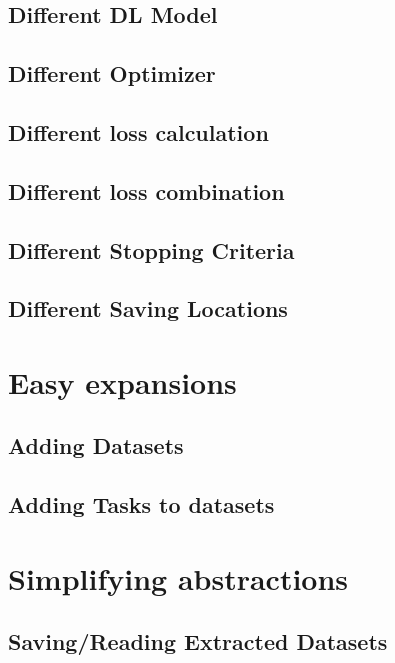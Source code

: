 \subsection{Different DL Model}

\subsection{Different Optimizer}

\subsection{Different loss calculation}

\subsection{Different loss combination}

\subsection{Different Stopping Criteria}

\subsection{Different Saving Locations}

\section{Easy expansions}

\subsection{Adding Datasets}

\subsection{Adding Tasks to datasets}

\section{Simplifying abstractions}

\subsection{Saving/Reading Extracted Datasets}

